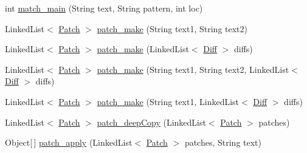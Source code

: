 \begin{DoxyCompactItemize}
int \hyperlink{classorg_1_1buildmlearn_1_1toolkit_1_1utilities_1_1diff__match__patch_a4be87a57b645c96c2f8567b4a1ab081b}{match\+\_\+main} (String text, String pattern, int loc)
\item 
Linked\+List$<$ \hyperlink{classorg_1_1buildmlearn_1_1toolkit_1_1utilities_1_1diff__match__patch_1_1Patch}{Patch} $>$ \hyperlink{classorg_1_1buildmlearn_1_1toolkit_1_1utilities_1_1diff__match__patch_a5fe18be0a56e0f65ba594ea7d0f88e62}{patch\+\_\+make} (String text1, String text2)
\item 
Linked\+List$<$ \hyperlink{classorg_1_1buildmlearn_1_1toolkit_1_1utilities_1_1diff__match__patch_1_1Patch}{Patch} $>$ \hyperlink{classorg_1_1buildmlearn_1_1toolkit_1_1utilities_1_1diff__match__patch_aa467b447116f168c94efe7ff7fda299a}{patch\+\_\+make} (Linked\+List$<$ \hyperlink{classorg_1_1buildmlearn_1_1toolkit_1_1utilities_1_1diff__match__patch_1_1Diff}{Diff} $>$ diffs)
\item 
Linked\+List$<$ \hyperlink{classorg_1_1buildmlearn_1_1toolkit_1_1utilities_1_1diff__match__patch_1_1Patch}{Patch} $>$ \hyperlink{classorg_1_1buildmlearn_1_1toolkit_1_1utilities_1_1diff__match__patch_a77d8a5c3c7e14b48942502b27c37f379}{patch\+\_\+make} (String text1, String text2, Linked\+List$<$ \hyperlink{classorg_1_1buildmlearn_1_1toolkit_1_1utilities_1_1diff__match__patch_1_1Diff}{Diff} $>$ diffs)
\item 
Linked\+List$<$ \hyperlink{classorg_1_1buildmlearn_1_1toolkit_1_1utilities_1_1diff__match__patch_1_1Patch}{Patch} $>$ \hyperlink{classorg_1_1buildmlearn_1_1toolkit_1_1utilities_1_1diff__match__patch_a240348ae5ab84cbcf6ee15f7a1b4cb7f}{patch\+\_\+make} (String text1, Linked\+List$<$ \hyperlink{classorg_1_1buildmlearn_1_1toolkit_1_1utilities_1_1diff__match__patch_1_1Diff}{Diff} $>$ diffs)
\item 
Linked\+List$<$ \hyperlink{classorg_1_1buildmlearn_1_1toolkit_1_1utilities_1_1diff__match__patch_1_1Patch}{Patch} $>$ \hyperlink{classorg_1_1buildmlearn_1_1toolkit_1_1utilities_1_1diff__match__patch_a3da243bc7df48d2e0da5166441bcad8e}{patch\+\_\+deep\+Copy} (Linked\+List$<$ \hyperlink{classorg_1_1buildmlearn_1_1toolkit_1_1utilities_1_1diff__match__patch_1_1Patch}{Patch} $>$ patches)
\item 
Object\mbox{[}$\,$\mbox{]} \hyperlink{classorg_1_1buildmlearn_1_1toolkit_1_1utilities_1_1diff__match__patch_a6f6cd205d8dc689294c13ea483dac1db}{patch\+\_\+apply} (Linked\+List$<$ \hyperlink{classorg_1_1buildmlearn_1_1toolkit_1_1utilities_1_1diff__match__patch_1_1Patch}{Patch} $>$ patches, String text)
\item 

\end{DoxyCompactItemize}
